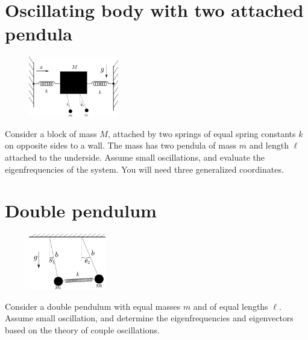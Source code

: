 \documentclass{article}
\begin{document}
    \section{Oscillating body with two attached pendula}
    \begin{figure}
        \includegraphics[width=0.35\textwidth]{figures/figure_3.pdf}
    \end{figure}
    Consider a block of mass $M$, attached by two springs of equal spring constants $k$ on opposite sides to a wall. The mass has two pendula of mass $m$ and length $\ell$ attached to the underside. Assume small oscillations, and evaluate the eigenfrequencies of the system. You will need three generalized coordinates.

    \section{Double pendulum}
    \begin{figure}
        \includegraphics[width=0.3\textwidth]{figures/figure_1.pdf}
    \end{figure}
    Consider a double pendulum with equal masses $m$ and of equal lengths $\ell$. Assume small oscillation, and determine the eigenfrequencies and eigenvectors based on the theory of couple oscillations.
\end{document}
